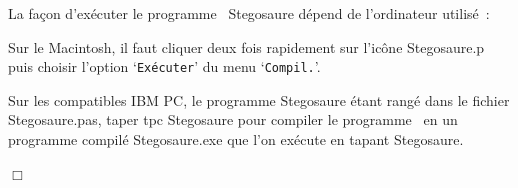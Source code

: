 \begin{corrige}{
La façon d'exécuter le programme \pascal\ {\idt Ste\-go\-sau\-re}
dépend de l'ordinateur \hbox{utilisé~:}

\tiret Sur le 
Macintosh, il faut cliquer deux fois rapidement sur l'icône {\idt Ste\-go\-sau\-re.p}
puis choisir l'option `{\tt Exécuter}' du  menu `{\tt Compil.}'. 

\tiret Sur les
compatibles IBM PC, le programme {\idt Stegosaure} étant rangé dans le
fichier {\idt Stegosaure.pas}, taper {\idt tpc Stegosaure} pour compiler le
programme \pascal\ en un programme compilé {\idt Stegosaure.exe} que l'on
exécute en tapant {\idt Stegosaure}.

\noindent $\Box$}\end{corrige}

